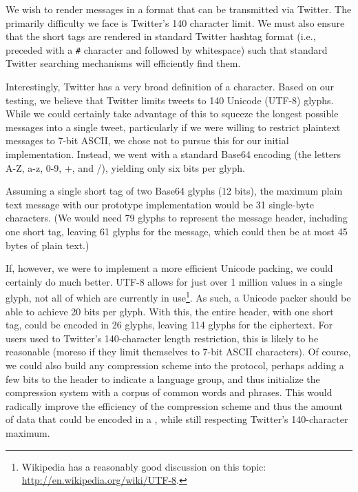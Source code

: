 
We wish to render messages in a format that can be transmitted via
Twitter. The primarily difficulty we face is Twitter's 140 character
limit. We must also ensure that the short tags are rendered in standard
Twitter hashtag format (i.e., preceded with a {\tt \#} character and
followed by whitespace) such that standard Twitter searching mechanisms
will efficiently find them.

Interestingly, Twitter has a very broad definition of a character. Based
on our testing, we believe that Twitter limits tweets to 140 Unicode
(UTF-8) glyphs. While we could certainly take advantage of this to
squeeze the longest possible \hoot messages into a single tweet,
particularly if we were willing to restrict \hoot plaintext messages to
7-bit ASCII, we chose not to pursue this for our
initial implementation. Instead, we went with a standard Base64 encoding (the
letters A-Z, a-z, 0-9, +, and /), yielding only six bits per glyph.

Assuming a single short tag of two Base64 glyphs (12 bits), the maximum
plain text message with our prototype implementation would be 31
single-byte characters. (We would need 79 glyphs to represent the
message header, including one short tag, leaving 61 glyphs for the
message, which could then be at most 45 bytes of plain text.)

If, however, we were to implement a more efficient Unicode packing, we
could certainly do much better. UTF-8 allows for just over 1 million
values in a single glyph, not all of which are currently in use\footnote{Wikipedia has a
  reasonably good discussion on this topic:
  \url{http://en.wikipedia.org/wiki/UTF-8}.}. As such, a Unicode packer
should be able to achieve 20 bits per glyph. With this, the entire \hoot
header, with one short tag, could be encoded in 26 glyphs, leaving 114
glyphs for the ciphertext. For users used to Twitter's 140-character
length restriction,
this is likely to be reasonable (moreso if they limit themselves to
7-bit ASCII characters). Of course, we could also build any
compression scheme into the \hoot protocol, perhaps adding a 
few bits to the header to indicate a language group, and thus
initialize the compression system with a corpus of common words
and phrases. This would radically improve the efficiency of the
compression scheme and thus the amount of data that could be encoded
in a \hoot, while still respecting Twitter's 140-character maximum.

